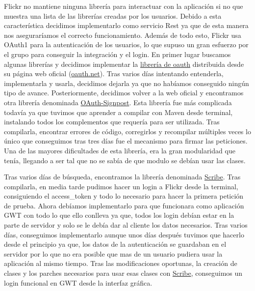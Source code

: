 \documentclass{scrartcl}
\begin{document}
Flickr no mantiene ninguna librería para interactuar con la aplicación si no que muestra una lista de las librerías creadas por los usuarios. Debido a esta característica decidimos implementarlo como servicio Rest ya que de esta manera nos aseguraríamos el correcto funcionamiento. Además de todo esto, Flickr usa OAuth1 para la autenticación de los usuarios, lo que supuso un gran esfuerzo por el grupo para conseguir la integración y el login. En primer lugar buscamos algunas librerías y decidimos implementar la  \href{http://oauth.googlecode.com/svn/code/java/core/}{librería de oauth} distribuida desde su página web oficial (\url{oauth.net}). Tras varios días intentando entenderla, implementarla y usarla, decidimos dejarla ya que no habíamos conseguido ningún tipo de avance. Posteriormente, decidimos volver a la web oficial y encontramos otra librería denominada \href{https://github.com/mttkay/signpost}{OAuth-Signpost}. Esta librería fue más complicada todavía ya que tuvimos que aprender a compilar con Maven desde terminal, instalando todos los complementos que requería para ser utilizada. Tras compilarla, encontrar errores de código, corregirlos y recompilar múltiples veces lo único que conseguimos tras tres días fue el mecanismo para firmar las peticiones. Una de las mayores dificultades de esta librería, era la gran modularidad que tenía, llegando a ser tal que no se sabía de que modulo se debían usar las clases. 

Tras varios días de búsqueda, encontramos la librería denominada \href{https://github.com/fernandezpablo85/scribe-java}{Scribe}. Tras compilarla, en media tarde pudimos hacer un login a Flickr desde la terminal, consiguiendo el access\_token y todo lo necesario para hacer la primera petición de prueba. Ahora debíamos implementarlo para que funcionara como aplicación GWT con todo lo que ello conlleva ya que, todos los login debían estar en la parte de servidor y solo se le debía dar al cliente los datos necesarios. Tras varios días, conseguimos implementarlo aunque unos días después tuvimos que hacerlo desde el principio ya que, los datos de la autenticación se guardaban en el servidor por lo que no era posible que mas de un usuario pudiera usar la aplicación al mismo tiempo. Tras las modificaciones oportunas, la creación de clases y los parches necesarios para usar esas clases con \href{https://github.com/fernandezpablo85/scribe-java}{Scribe}, conseguimos un login funcional en GWT desde la interfaz gráfica.
\end{document}
